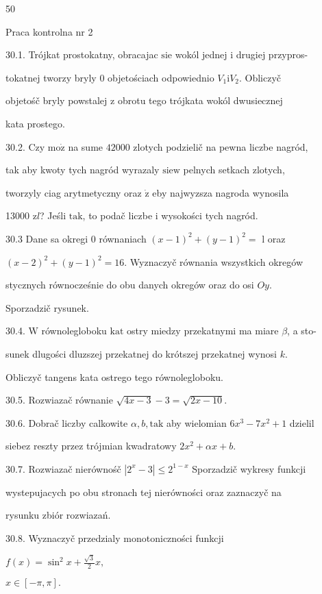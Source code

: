 \documentclass[a4paper,12pt]{article}
\begin{document}
50

Praca kontrolna nr 2

30.1. Trójkat prostokatny, obracajac $\mathrm{s}\mathrm{i}\mathrm{e}$ wokól jednej $\mathrm{i}$ drugiej przypros-

tokatnej tworzy bryly $0$ objetościach odpowiednio $V_{1}\mathrm{i}V_{2}$. Obliczyč

objetośč bryly powstalej $\mathrm{z}$ obrotu tego trójkata wokól dwusiecznej

kata prostego.

30.2. Czy $\mathrm{m}\mathrm{o}\dot{\mathrm{z}}$ na sume $42000$ zlotych podzielič na pewna liczbe nagród,

tak aby kwoty tych nagród wyrazaly $\mathrm{s}\mathrm{i}\mathrm{e}\mathrm{w}$ pelnych setkach zlotych,

tworzyly ciag arytmetyczny oraz $\dot{\mathrm{z}}$ eby najwyzsza nagroda wynosila

13000 $\mathrm{z}l$? Jeśli $\mathrm{t}\mathrm{a}\mathrm{k}$, to podač liczbe $\mathrm{i}$ wysokości tych nagród.

30.3 Dane sa okregi $0$ równaniach $(x-1)^{2} + (y-1)^{2} =$ l oraz

$(x-2)^{2}+(y-1)^{2}=16$. Wyznaczyč równania wszystkich okregów

stycznych równocześnie do obu danych okregów oraz do osi $Oy.$

Sporzadzič rysunek.

30.4. $\mathrm{W}$ równolegloboku $\mathrm{k}\mathrm{a}\mathrm{t}$ ostry miedzy przekatnymi ma miare $\beta$, a sto-

sunek dlugości dluzszej przekatnej do krótszej przekatnej wynosi $k.$

Obliczyč tangens kata ostrego tego równolegloboku.

30.5. Rozwiazač równanie $\sqrt{4x-3}-3=\sqrt{2x-10}.$

30.6. Dobrač liczby calkowite $\alpha, b, \mathrm{t}\mathrm{a}\mathrm{k}$ aby wielomian $6x^{3}-7x^{2}+1$ dzielil

siebez reszty przez trójmian kwadratowy $2x^{2}+\alpha x+b.$

30.7. Rozwiazač nierównośč $|2^{x}-3| \leq 2^{1-x}$ Sporzadzič wykresy funkcji

wystepujacych po obu stronach tej nierówności oraz zaznaczyč na

rysunku zbiór rozwiazań.

30.8. Wyznaczyč przedzialy monotoniczności funkcji

$f(x)=\displaystyle \sin^{2}x+\frac{\sqrt{3}}{2}x,$

$x\in[-\pi,\pi].$
\end{document}
